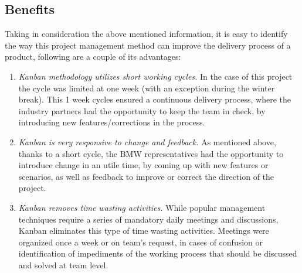         \subsection{Benefits}
        Taking in consideration the above mentioned information, it is easy to identify the way this project management method can improve the delivery process of a product, following are a couple of its advantages: 
            \begin{enumerate}
                \item \textit{Kanban methodology utilizes short working cycles.} In the case of this project the cycle was limited at one week (with an exception during the winter break).  This 1 week cycles ensured a continuous delivery process, where the industry partners had the opportunity to keep the team in check, by introducing new features/corrections in the process.
                \item \textit{Kanban is very responsive to change and feedback.} As mentioned above, thanks to a short cycle, the BMW representatives had the opportunity to introduce change in an utile time, by coming up with new features or scenarios, as well as feedback to improve or correct the direction of the project.
                \item \textit{Kanban removes time wasting activities.} While popular management techniques require a series of mandatory daily meetings and discussions, Kanban eliminates this type of time wasting activities. Meetings were organized once a week or on team’s request, in cases of confusion or identification of impediments of the working process that should be discussed and solved at team level.
            \end{enumerate}
